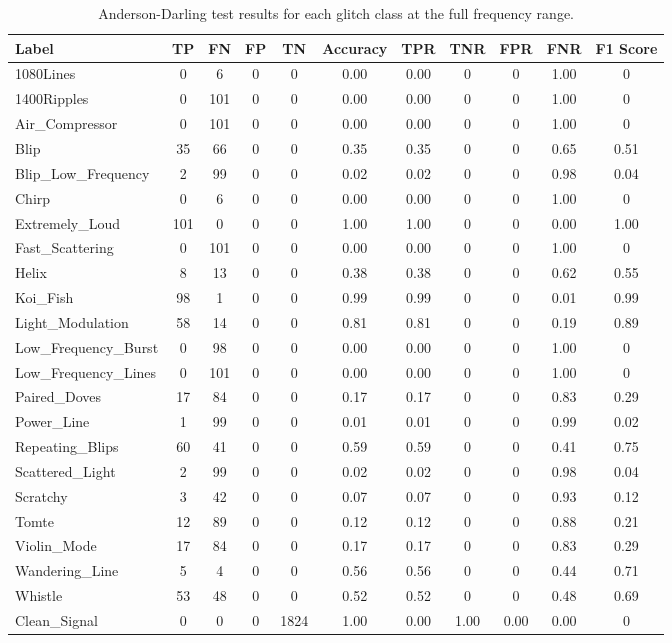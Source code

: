 \documentclass[12pt]{article}
\begin{document}
\begin{table}[H]
  \centering
  \begin{tabular}{lcccccccccc}
  \toprule
  Label & TP & FN & FP & TN & Accuracy & TPR & TNR & FPR & FNR & F1 Score \\
  \midrule
  1080Lines & 0 & 6 & 0 & 0 & 0.00 & 0.00 & 0 & 0 & 1.00 & 0 \\
  1400Ripples & 0 & 101 & 0 & 0 & 0.00 & 0.00 & 0 & 0 & 1.00 & 0 \\
  Air\_Compressor & 0 & 101 & 0 & 0 & 0.00 & 0.00 & 0 & 0 & 1.00 & 0 \\
  Blip & 35 & 66 & 0 & 0 & 0.35 & 0.35 & 0 & 0 & 0.65 & 0.51 \\
  Blip\_Low\_Frequency & 2 & 99 & 0 & 0 & 0.02 & 0.02 & 0 & 0 & 0.98 & 0.04 \\
  Chirp & 0 & 6 & 0 & 0 & 0.00 & 0.00 & 0 & 0 & 1.00 & 0 \\
  Extremely\_Loud & 101 & 0 & 0 & 0 & 1.00 & 1.00 & 0 & 0 & 0.00 & 1.00 \\
  Fast\_Scattering & 0 & 101 & 0 & 0 & 0.00 & 0.00 & 0 & 0 & 1.00 & 0 \\
  Helix & 8 & 13 & 0 & 0 & 0.38 & 0.38 & 0 & 0 & 0.62 & 0.55 \\
  Koi\_Fish & 98 & 1 & 0 & 0 & 0.99 & 0.99 & 0 & 0 & 0.01 & 0.99 \\
  Light\_Modulation & 58 & 14 & 0 & 0 & 0.81 & 0.81 & 0 & 0 & 0.19 & 0.89 \\
  Low\_Frequency\_Burst & 0 & 98 & 0 & 0 & 0.00 & 0.00 & 0 & 0 & 1.00 & 0 \\
  Low\_Frequency\_Lines & 0 & 101 & 0 & 0 & 0.00 & 0.00 & 0 & 0 & 1.00 & 0 \\
  Paired\_Doves & 17 & 84 & 0 & 0 & 0.17 & 0.17 & 0 & 0 & 0.83 & 0.29 \\
  Power\_Line & 1 & 99 & 0 & 0 & 0.01 & 0.01 & 0 & 0 & 0.99 & 0.02 \\
  Repeating\_Blips & 60 & 41 & 0 & 0 & 0.59 & 0.59 & 0 & 0 & 0.41 & 0.75 \\
  Scattered\_Light & 2 & 99 & 0 & 0 & 0.02 & 0.02 & 0 & 0 & 0.98 & 0.04 \\
  Scratchy & 3 & 42 & 0 & 0 & 0.07 & 0.07 & 0 & 0 & 0.93 & 0.12 \\
  Tomte & 12 & 89 & 0 & 0 & 0.12 & 0.12 & 0 & 0 & 0.88 & 0.21 \\
  Violin\_Mode & 17 & 84 & 0 & 0 & 0.17 & 0.17 & 0 & 0 & 0.83 & 0.29 \\
  Wandering\_Line & 5 & 4 & 0 & 0 & 0.56 & 0.56 & 0 & 0 & 0.44 & 0.71 \\
  Whistle & 53 & 48 & 0 & 0 & 0.52 & 0.52 & 0 & 0 & 0.48 & 0.69 \\
  Clean\_Signal & 0 & 0 & 0 & 1824 & 1.00 & 0.00 & 1.00 & 0.00 & 0.00 & 0 \\
  \bottomrule
  \end{tabular}
  \caption{Anderson-Darling test results for each glitch class at the full frequency range.}
  \label{tab:ad_full_range_results}
\end{table}
\end{document}
